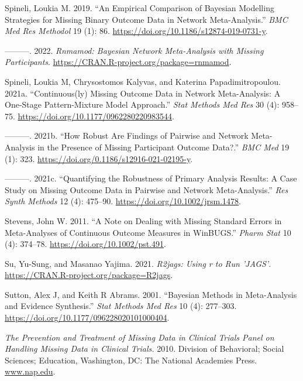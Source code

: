 \begin{CSLReferences}{1}{0}
\leavevmode{}%
Spineli, Loukia M. 2019. {``An Empirical Comparison of Bayesian Modelling Strategies for Missing Binary Outcome Data in Network Meta-Analysis.''} \emph{BMC Med Res Methodol} 19 (1): 86. \url{https://doi.org/10.1186/s12874-019-0731-y}.

\leavevmode{}%
---------. 2022. \emph{Rnmamod: Bayesian Network Meta-Analysis with Missing Participants}. \url{https://CRAN.R-project.org/package=rnmamod}.

\leavevmode{}%
Spineli, Loukia M, Chrysostomos Kalyvas, and Katerina Papadimitropoulou. 2021a. {``Continuous(ly) Missing Outcome Data in Network Meta-Analysis: A One-Stage Pattern-Mixture Model Approach.''} \emph{Stat Methods Med Res} 30 (4): 958--75. \url{https://doi.org/10.1177/0962280220983544}.

\leavevmode{}%
---------. 2021b. {``How Robust Are Findings of Pairwise and Network Meta-Analysis in the Presence of Missing Participant Outcome Data?.''} \emph{BMC Med} 19 (1): 323. \url{https://doi.org/0.1186/s12916-021-02195-y}.

\leavevmode{}%
---------. 2021c. {``Quantifying the Robustness of Primary Analysis Results: A Case Study on Missing Outcome Data in Pairwise and Network Meta-Analysis.''} \emph{Res Synth Methods} 12 (4): 475--90. \url{https://doi.org/10.1002/jrsm.1478}.

\leavevmode{}%
Stevens, John W. 2011. {``A Note on Dealing with Missing Standard Errors in Meta-Analyses of Continuous Outcome Measures in WinBUGS.''} \emph{Pharm Stat} 10 (4): 374--78. \url{https://doi.org/10.1002/pst.491}.

\leavevmode{}%
Su, Yu-Sung, and Masanao Yajima. 2021. \emph{R2jags: Using r to Run 'JAGS'}. \url{https://CRAN.R-project.org/package=R2jags}.

\leavevmode{}%
Sutton, Alex J, and Keith R Abrams. 2001. {``Bayesian Methods in Meta-Analysis and Evidence Synthesis.''} \emph{Stat Methods Med Res} 10 (4): 277--303. \url{https://doi.org/10.1177/096228020101000404}.

\leavevmode{}%
\emph{The Prevention and Treatment of Missing Data in Clinical Trials Panel on Handling Missing Data in Clinical Trials.} 2010. Division of Behavioral; Social Sciences; Education, Washington, DC: The National Academies Press. \href{https://www.nap.edu}{www.nap.edu}.


\end{CSLReferences}
